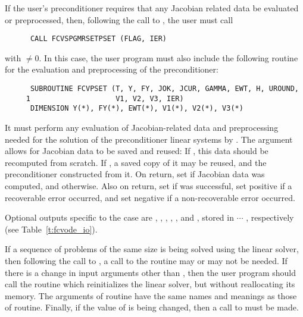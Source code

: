 \begin{Steps}
\begin{itemize}
    
    If the user's preconditioner requires that any Jacobian related data be evaluated
    or preprocessed, then, following the call to , the user must call
\begin{verbatim}
      CALL FCVSPGMRSETPSET (FLAG, IER)
\end{verbatim}
    with $\neq 0$.
    In this case, the user program must also include
    the following routine for the evaluation and preprocessing of the preconditioner:
\begin{verbatim}
      SUBROUTINE FCVPSET (T, Y, FY, JOK, JCUR, GAMMA, EWT, H, UROUND, 
     1                    V1, V2, V3, IER)
      DIMENSION Y(*), FY(*), EWT(*), V1(*), V2(*), V3(*) 
\end{verbatim}
    It must perform any evaluation of Jacobian-related data and preprocessing needed
    for the solution of the preconditioner linear systems by .
    The  argument allows for Jacobian data to be saved and reused:  If 
    , this data should be recomputed from scratch. If , a saved
    copy of it may be reused, and the preconditioner constructed from it.
    On return, set  if Jacobian data was computed, and  otherwise.
    Also on return, set  if  was successful, set 
    positive if a recoverable error occurred, and set  negative if a 
    non-recoverable error occurred.
    
    Optional outputs specific to the {\spgmr} case are , , , 
    , , and , stored in  $\cdots$ , 
    respectively (see Table~\ref{t:fcvode_io}).
    
    If a sequence of problems of the same size is being solved using the {\spgmr}
    linear solver, then following the call to , a call to the 
     routine may or may not be needed.  
    If there is a change in input arguments other than , then the user 
    program should call the routine  which
    reinitializes the {\spgmr} linear solver, but without reallocating its memory.
    The arguments of  routine have the same names and meanings
    as those of  routine.  Finally, if the value of  is
    being changed, then a call to  must be made.
  \end{itemize}    


\end{Steps}

